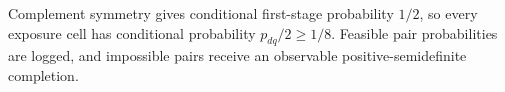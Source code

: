 Complement symmetry gives conditional first-stage probability \(1/2\), so every exposure cell has conditional probability \(p_{dq}/2\geq1/8\).  Feasible pair probabilities are logged, and impossible pairs receive an observable positive-semidefinite completion.